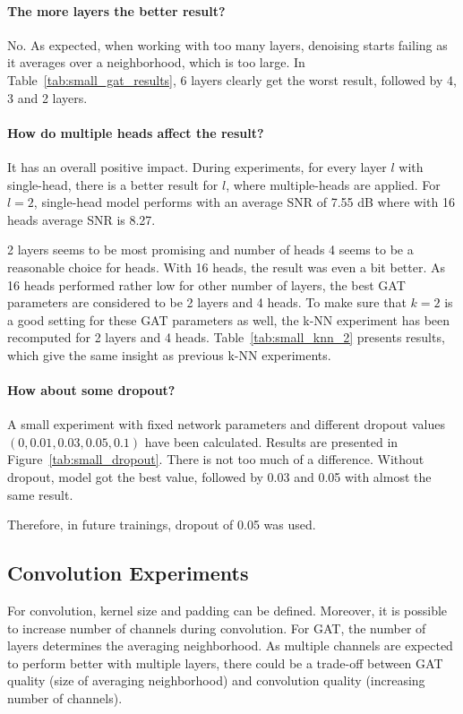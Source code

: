 \paragraph{The more layers the better result?}
No. As expected, when working with too many layers, denoising starts failing as it averages over a
neighborhood, which is too large. In Table~\ref{tab:small_gat_results}, 6 layers clearly get the worst result,
followed by 4, 3 and 2 layers.

\paragraph{How do multiple heads affect the result?}
It has an overall positive impact. 
During experiments, for every layer $l$ with single-head, there is a better result for $l$, where multiple-heads are applied. 
For $l=2$, single-head model performs with an average SNR of 7.55 dB where with 16 heads average SNR is 8.27.

2 layers seems to be most promising and number of heads 4 seems to be a reasonable choice for heads.
With 16 heads, the result was even a bit better. As 16 heads performed rather low for other number of layers, 
the best GAT parameters are considered to be 2 layers and 4 heads.
To make sure that $k=2$ is a good setting for these GAT parameters as well, the k-NN experiment
has been recomputed for 2 layers and 4 heads. Table~\ref{tab:small_knn_2} presents results, which 
give the same insight as previous k-NN experiments.

\paragraph{How about some dropout?}
A small experiment with fixed network parameters
and different dropout values $(0, 0.01, 0.03, 0.05, 0.1)$ have been calculated. 
Results are presented in Figure~\ref{tab:small_dropout}.
There is not too much of a difference. Without dropout, model got the best value, followed by 
0.03 and 0.05 with almost the same result. 

Therefore, in future trainings, dropout of 0.05 was used.

\subsection{Convolution Experiments}

For convolution, kernel size and padding can be defined.
Moreover, it is possible to increase number of channels during convolution. 
For GAT, the number of layers determines the averaging neighborhood.
As multiple channels are expected to perform better with multiple layers,
there could be a trade-off between GAT quality (size of averaging neighborhood) and convolution quality (increasing number of channels). 

